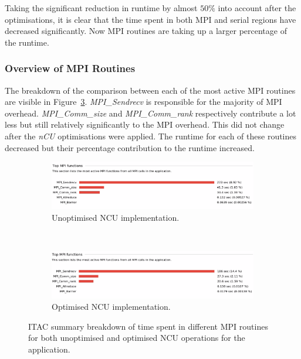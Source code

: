 Taking the significant reduction in runtime by almost $50\%$ into account after the optimisations, it is clear that the time spent in both MPI and serial regions have decreased significantly. Now MPI routines are taking up a larger percentage of the runtime.

\subsubsection{Overview of MPI Routines}
\label{sec:overview_MPI_routines}
The breakdown of the comparison between each of the most active MPI routines are visible in Figure~\ref{fig:itac_mpi_bar}. \textit{MPI\_Sendrecv} is responsible for the majority of MPI overhead. \textit{MPI\_Comm\_size} and \textit{MPI\_Comm\_rank} respectively contribute a lot less but still relatively significantly to the MPI overhead. This did not change after the \textit{nCU} optimisations were applied. The runtime for each of these routines decreased but their percentage contribution to the runtime increased.

\begin{figure}[!ht]
    \centering
    \begin{subfigure}{1.\linewidth}
        \centering
        \includegraphics[width=1.\linewidth]{Images/MPI_Comms_Bar/orig_comms_bar.png}
		\caption{Unoptimised NCU implementation.}
        \label{fig:itac_mpi_bar_unopt_ncu}
    \end{subfigure}\\
    \begin{subfigure}{1.\linewidth}
        \centering
        \includegraphics[width=1.\linewidth]{Images/MPI_Comms_Bar/ncu_comms_bar.png}
		\caption{Optimised NCU implementation.}
        \label{fig:itac_mpi_bar_opt_ncu}
    \end{subfigure}
    \caption{ITAC summary breakdown of time spent in different MPI routines for both unoptimised and optimised NCU operations for the application.}
        \label{fig:itac_mpi_bar}
\end{figure}

